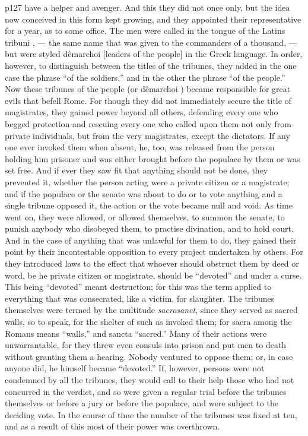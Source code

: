 p127 have a helper and avenger. And this they did not once only, but the idea now conceived in this form kept growing, and they appointed their representative for a year, as to some office. The men were called in the tongue of the Latins tribuni , \texthebrew{—} the same name that was given to the commanders of a thousand, \texthebrew{—} but were styled dêmarchoi [leaders of the people] in the Greek language. In order, however, to distinguish between the titles of the tribunes, they added in the one case the phrase ``of the soldiers,'' and in the other the phrase ``of the people.'' Now these tribunes of the people (or dêmarchoi ) became responsible for great evils that befell Rome. For though they did not immediately secure the title of magistrates, they gained power beyond all others, defending every one who begged protection and rescuing every one who called upon them not only from private individuals, but from the very magistrates, except the dictators. If any one ever invoked them when absent, he, too, was released from the person holding him prisoner and was either brought before the populace by them or was set free. And if ever they saw fit that anything should not be done, they prevented it, whether the person acting were a private citizen or a magistrate; and if the populace or the senate was about to do or to vote anything and a single tribune opposed it, the action or the vote became null and void. As time went on, they were allowed, or allowed themselves, to summon the senate, to punish anybody who disobeyed them, to practise divination, and to hold court. And in the case of anything that was unlawful for them to do, they gained their point by their incontestable opposition to every project undertaken by others. For they introduced laws to the effect that whoever should obstruct them by deed or word, be he private citizen or magistrate, should be ``devoted'' and under a curse. This being ``devoted'' meant destruction; for this was the term applied to everything that was consecrated, like a victim, for slaughter. The tribunes themselves were termed by the multitude \emph{sacrosanct}, since they served as sacred walls, so to speak, for the shelter of such as invoked them; for sacra among the Romans means ``walls,'' and sancta ``sacred.'' Many of their actions were unwarrantable, for they threw even consuls into prison and put men to death without granting them a hearing. Nobody ventured to oppose them; or, in case anyone did, he himself became ``devoted.'' If, however, persons were not condemned by all the tribunes, they would call to their help those who had not concurred in the verdict, and so were given a regular trial before the tribunes themselves or before a jury or before the populace, and were subject to the deciding vote. In the course of time the number of the tribunes was fixed at ten, and as a result of this most of their power was overthrown.


